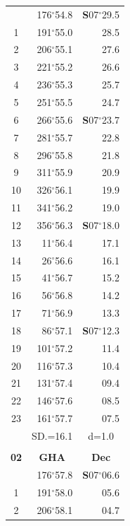 \documentclass[10pt, a4paper]{report}
\begin{document}
\begin{scriptsize}
\begin{tabular*}{0.2\textwidth}[t]{@{\extracolsep{\fill}}|c|rr|}
\hline\rule{0pt}{2.6ex}\noindent
0 & 176$^\circ$54.8 & \textbf{S}07$^\circ$29.5\\
1 & 191$^\circ$55.0 & 28.5\\
2 & 206$^\circ$55.1 & 27.6\\
3 & 221$^\circ$55.2 & \raisebox{0.24ex}{\boldmath$\cdot$~\boldmath$\cdot$~~}26.6\\
4 & 236$^\circ$55.3 & 25.7\\
5 & 251$^\circ$55.5 & 24.7\\[2Pt]
6 & 266$^\circ$55.6 & \textbf{S}07$^\circ$23.7\\
7 & 281$^\circ$55.7 & 22.8\\
8 & 296$^\circ$55.8 & 21.8\\
9 & 311$^\circ$55.9 & \raisebox{0.24ex}{\boldmath$\cdot$~\boldmath$\cdot$~~}20.9\\
10 & 326$^\circ$56.1 & 19.9\\
11 & 341$^\circ$56.2 & 19.0\\[2Pt]
12 & 356$^\circ$56.3 & \textbf{S}07$^\circ$18.0\\
13 & 11$^\circ$56.4 & 17.1\\
14 & 26$^\circ$56.6 & 16.1\\
15 & 41$^\circ$56.7 & \raisebox{0.24ex}{\boldmath$\cdot$~\boldmath$\cdot$~~}15.2\\
16 & 56$^\circ$56.8 & 14.2\\
17 & 71$^\circ$56.9 & 13.3\\[2Pt]
18 & 86$^\circ$57.1 & \textbf{S}07$^\circ$12.3\\
19 & 101$^\circ$57.2 & 11.4\\
20 & 116$^\circ$57.3 & 10.4\\
21 & 131$^\circ$57.4 & \raisebox{0.24ex}{\boldmath$\cdot$~\boldmath$\cdot$~~}09.4\\
22 & 146$^\circ$57.6 & 08.5\\
23 & 161$^\circ$57.7 & 07.5\\
\hline
\rule{0pt}{2.4ex} & \multicolumn{1}{c}{SD.=16.1} & \multicolumn{1}{c|}{d=1.0}\\
\hline
\multicolumn{1}{c}{}\\[-0.5ex]\hline
\multicolumn{1}{|c|}{\rule{0pt}{2.6ex}\textbf{02}} & \multicolumn{1}{c}{\textbf{GHA}} & \multicolumn{1}{c|}{\textbf{Dec}}\\
\hline\rule{0pt}{2.6ex}\noindent
0 & 176$^\circ$57.8 & \textbf{S}07$^\circ$06.6\\
1 & 191$^\circ$58.0 & 05.6\\
2 & 206$^\circ$58.1 & 04.7\\

\end{tabular*}
\end{scriptsize}
\end{document}
